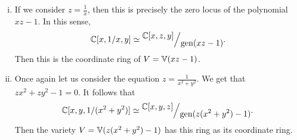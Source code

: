 \documentclass[12pt]{memoir}
\begin{document}
  \begin{ptcbr}
    \begin{enumerate}[i)]
      \itemsep=-0.4em
      \item If we consider $z=\frac{1}{x}$, then this is precisely the zero locus of the polynomial $xz-1$. In this sense, 
      $$\bC[x,1/x,y]\isom\quot{\bC[x,z,y]}{\gen(xz-1)}.$$
      Then this is the coordinate ring of $V=\mathbb{V}(xz-1)$.
      \item Once again let us consider the equation $z=\frac{1}{x^2+y^2}$. We get that $zx^2+zy^2-1=0$. It follows that 
      $$\bC[x,y,1/(x^2+y^2)]\isom\quot{\bC[x,y,z]}{\gen(z(x^2+y^2)-1)}.$$
      Then the variety $V=\mathbb{V}(z(x^2+y^2)-1)$ has this ring as its coordinate ring.
    \end{enumerate}
  \end{ptcbr}
\end{document}
